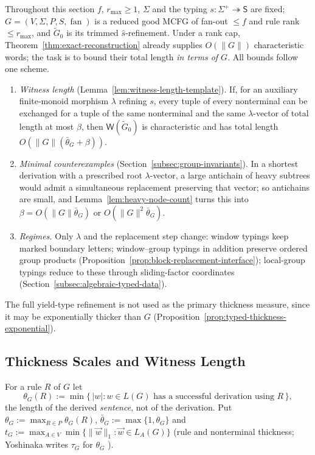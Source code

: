 \documentclass[11pt]{article}
\numberwithin{equation}{section}
\theoremstyle{plain}
\theoremstyle{definition}
\theoremstyle{remark}
\newcommand{\Wit}{\mathsf{W}}
\newcommand{\tuple}[1]{\vec{#1}}
\newcommand{\fan}{\operatorname{fan}}
\begin{document}
Throughout this section $f$, $r_{\max}\ge1$, $\Sigma$ and the typing
$s:\Sigma^+\twoheadrightarrow\mathsf S$ are fixed;
$G=(V,\Sigma,P,S,\fan)$ is a reduced good MCFG of fan-out $\le f$ and rule
rank $\le r_{\max}$, and $\widetilde G_0$ is its trimmed $\widehat s$-refinement.
Under a rank cap, Theorem~\ref{thm:exact-reconstruction} already supplies
$O(\|G\|)$ characteristic words; the task is to bound their total length
\emph{in terms of $G$}.  All bounds follow one scheme.
\begin{enumerate}[label=\textup{(\arabic*)},leftmargin=*]
\item \emph{Witness length} (Lemma~\ref{lem:witness-length-template}).  If, for
an auxiliary finite-monoid morphism $\lambda$ refining $s$, every tuple of every
nonterminal can be exchanged for a tuple of the same nonterminal and the same
$\lambda$-vector of total length at most $\beta$, then $\Wit(\widetilde G_0)$ is
characteristic and has total length $O(\|G\|(\bar\theta_G+\beta))$.
\item \emph{Minimal counterexamples} (Section~\ref{subsec:group-invariants}).  In
a shortest derivation with a prescribed root $\lambda$-vector, a large antichain
of heavy subtrees would admit a simultaneous replacement preserving that vector;
so antichains are small, and Lemma~\ref{lem:heavy-node-count} turns this into
$\beta=O(\|G\|\bar\theta_G)$ or $O(\|G\|^2\bar\theta_G)$.
\item \emph{Regimes.}  Only $\lambda$ and the replacement step change: window
typings keep marked boundary letters; window--group typings in addition
preserve ordered group products
(Proposition~\ref{prop:block-replacement-interface}); local-group typings
reduce to these through sliding-factor coordinates
(Section~\ref{subsec:algebraic-typed-data}).
\end{enumerate}
The full yield-type refinement is not used as the primary thickness
measure, since it may be exponentially thicker than $G$
(Proposition~\ref{prop:typed-thickness-exponential}).

\subsection{Thickness Scales and Witness Length}
\label{subsec:thickness-contexts}

For a rule $R$ of $G$ let
\[
 \theta_G(R):=\min\{\,|w|:w\in L(G)\text{ has a successful derivation using }R\,\},
\]
the length of the derived \emph{sentence}, not of the derivation.  Put
$\theta_G:=\max_{R\in P}\theta_G(R)$, $\bar\theta_G:=\max\{1,\theta_G\}$ and
$t_G:=\max_{A\in V}\min\{\|\tuple w\|_1:\tuple w\in L_A(G)\}$ (rule and
nonterminal thickness; Yoshinaka writes $\tau_G$ for $\theta_G$
\cite[Section~4.3]{Yoshinaka2011}).
\end{document}
